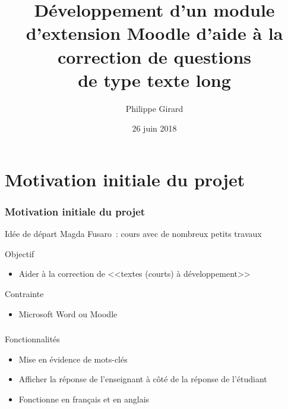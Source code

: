 \documentclass{beamer}
\title[Pr\'esentation du projet de ma\^itrise]{D\'eveloppement d'un module d'extension Moodle d'aide \`a la correction de questions\\de type \og texte long \fg{} }
\author{Philippe Girard}
\institute{Universit\'e du Qu\'ebec \`a Montr\'eal}
\date{26 juin 2018}
\begin{document}
  \begin{frame}[plain]
    \titlepage
  \end{frame}
  
  \begin{frame}[plain]
    \tableofcontents[hideallsubsections]
  \end{frame}
  
  \section[Introduction]{Motivation initiale du projet}
  \begin{frame}
    \frametitle{Motivation initiale du projet}

    \begin{block}{Id\'ee de d\'epart}
      Magda Fusaro~: cours avec de nombreux petits travaux 
    \end{block}

    \vfill

    \begin{block}{Objectif}
      \begin{itemize}
        \item Aider \`a la correction de <<textes (courts) \`a d\'eveloppement>>
      \end{itemize}
    \end{block}

    \vfill

    \begin{block}{Contrainte}
      \begin{itemize}
        \item Microsoft Word ou Moodle
      \end{itemize}
    \end{block}
    \vfill
  \end{frame}
  
  \begin{frame}
    \frametitle{\insertsection}
    \begin{block}{Fonctionnalit\'es}
      \begin{itemize}
        \item Mise en \'evidence de mots-cl\'es
        \item Afficher la r\'eponse de l'enseignant \`a c\^ot\'e de la r\'eponse de l'\'etudiant
        \item Fonctionne en fran\c{c}ais et en anglais
      \end{itemize}
    \end{block}
  \end{frame}
  
\end{document}
